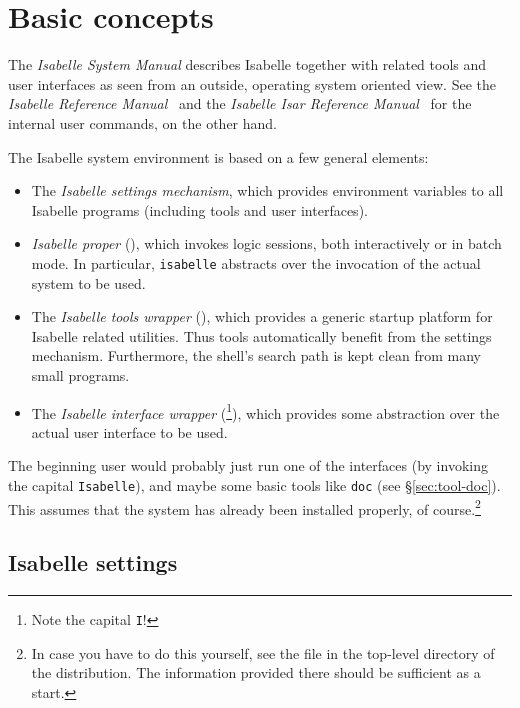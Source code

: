 

\chapter{Basic concepts}

The \emph{Isabelle System Manual} describes Isabelle together with related
tools and user interfaces as seen from an outside, operating system oriented
view.  See the \emph{Isabelle Reference Manual}~\cite{isabelle-ref} and the
\emph{Isabelle Isar Reference Manual}~\cite{isabelle-isar-ref} for the
internal user commands, on the other hand.

\medskip The Isabelle system environment is based on a few general elements:
\begin{itemize}
\item The \emph{Isabelle settings mechanism}, which provides
  environment variables to all Isabelle programs (including tools and
  user interfaces).
\item \emph{Isabelle proper} (), which invokes logic
  sessions, both interactively or in batch mode. In particular,
  \texttt{isabelle} abstracts over the invocation of the actual {\ML} system
  to be used.
\item The \emph{Isabelle tools wrapper} (), which
  provides a generic startup platform for Isabelle related utilities.
  Thus tools automatically benefit from the settings mechanism.
  Furthermore, the shell's search path is kept clean from many small
  programs.
\item The \emph{Isabelle interface wrapper}
  (\footnote{Note the capital \texttt{I}!}), which
  provides some abstraction over the actual user interface to be used.
\end{itemize}

\medskip The beginning user would probably just run one of the
interfaces (by invoking the capital \texttt{Isabelle}), and maybe some
basic tools like \texttt{doc} (see \S\ref{sec:tool-doc}).  This
assumes that the system has already been installed properly, of
course.\footnote{In case you have to do this yourself, see the
   file in the top-level directory of the
  distribution. The information provided there should be sufficient as
  a start.}


\section{Isabelle settings} \label{sec:settings}

